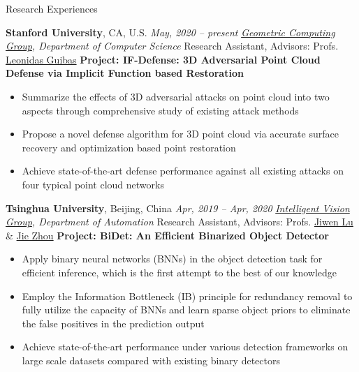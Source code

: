 \documentclass{resume} %
\begin{document}
\begin{rSection}{Research Experiences}

{\textbf{Stanford University}, CA, U.S.} \hfill {\em May, 2020 -- present}\newline
\emph{\href{https://geometry.stanford.edu/}{Geometric Computing Group}, Department of Computer Science}\newline
Research Assistant, Advisors: Profs. \href{https://geometry.stanford.edu/member/guibas/index.html}{Leonidas Guibas}\newline
\textbf{Project: IF-Defense: 3D Adversarial Point Cloud Defense via Implicit Function based Restoration}
\begin{itemize}
    \item Summarize the effects of 3D adversarial attacks on point cloud into two aspects through comprehensive study of existing attack methods
    \item Propose a novel defense algorithm for 3D point cloud via accurate surface recovery and optimization based point restoration
    \item Achieve state-of-the-art defense performance against all existing attacks on four typical point cloud networks\newline
\end{itemize}

{\textbf{Tsinghua University}, Beijing, China} \hfill {\em Apr, 2019 -- Apr, 2020}\newline
\emph{\href{http://ivg.au.tsinghua.edu.cn/index.php}{Intelligent Vision Group}, Department of Automation}\newline
Research Assistant, Advisors: Profs. \href{http://ivg.au.tsinghua.edu.cn/Jiwen_Lu/}{Jiwen Lu} \& \href{https://www.tsinghua.edu.cn/publish/auen/1713/2011/20110506105532098625469/20110506105532098625469_.html}{Jie Zhou}\newline
\textbf{Project: BiDet: An Efficient Binarized Object Detector}
\begin{itemize}
    \item Apply binary neural networks (BNNs) in the object detection task for efficient inference, which is the first attempt to the best of our knowledge
    \item Employ the Information Bottleneck (IB) principle for redundancy removal to fully utilize the capacity of BNNs and learn sparse object priors to eliminate the false positives in the prediction output
    \item Achieve state-of-the-art performance under various detection frameworks on large scale datasets compared with existing binary detectors\newline
\end{itemize}


\end{rSection}
\end{document}
